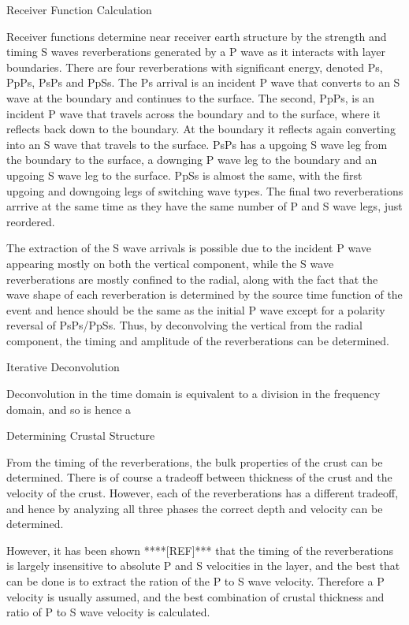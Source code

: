 
Receiver Function Calculation

Receiver functions determine near receiver earth structure by the strength and timing S waves reverberations generated by a P wave as it interacts with layer boundaries. There are four reverberations with significant energy, denoted Ps, PpPs, PsPs and PpSs. The Ps arrival is an incident P wave that converts to an S wave at the boundary and continues to the surface. The second, PpPs, is an incident P wave that travels across the boundary and to the surface, where it reflects back down to the boundary. At the boundary it reflects again converting into an S wave that travels to the surface. PsPs has a upgoing S wave leg from the boundary to the surface, a downging P wave leg to the boundary and an upgoing S wave leg to the surface. PpSs is almost the same, with the first upgoing and downgoing legs of switching wave types. The final two reverberations arrrive at the same time as they have the same number of P and S wave legs, just reordered.

The extraction of the S wave arrivals is possible due to the incident P wave appearing mostly on both the vertical component, while the S wave reverberations are mostly confined to the radial, along with the fact that the wave shape of each reverberation is determined by the source time function of the event and hence should be the same as the initial P wave except for a polarity reversal of PsPs/PpSs. Thus, by deconvolving the vertical from the radial component, the timing and amplitude of the reverberations can be determined. 

Iterative Deconvolution

Deconvolution in the time domain is equivalent to a division in the frequency domain, and so is hence a 

Determining Crustal Structure

From the timing of the reverberations, the bulk properties of the crust can be determined. There is of course a tradeoff between thickness of the crust and the velocity of the crust. However, each of the reverberations has a different tradeoff, and hence by analyzing all three phases the correct depth and velocity can be determined.

However, it has been shown ****[REF]*** that the timing of the reverberations is largely insensitive to absolute P and S velocities in the layer, and the best that can be done is to extract the ration of the P to S wave velocity. Therefore a P velocity is usually assumed, and the best combination of crustal thickness and ratio of P to S wave velocity is calculated.

